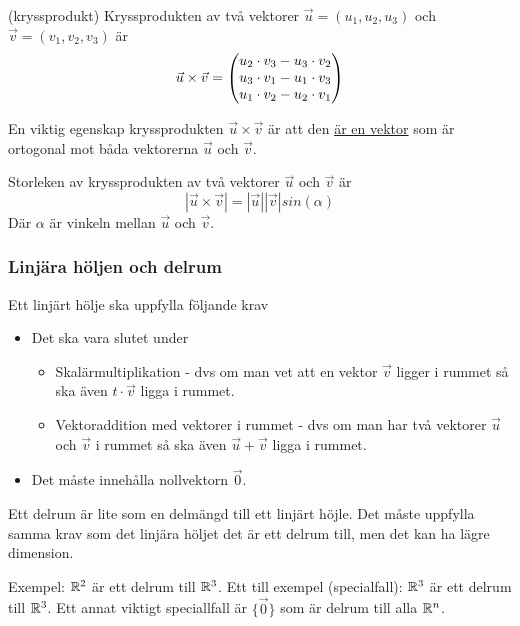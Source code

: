 \documentclass[../main.tex]{subfiles}
\begin{document}
\begin{formel}{(kryssprodukt)}
\label{kryssprod} 
Kryssprodukten av två vektorer $\vec{u} = (u_1, u_2, u_3)$ och $\vec{v} = (v_1, v_2, v_3)$ är
\[\vec{u}\times \vec{v} = \begin{pmatrix}u_2\cdot v_3 - u_3\cdot v_2\\u_3\cdot v_1 - u_1\cdot v_3\\u_1\cdot v_2 - u_2\cdot v_1\end{pmatrix}\]

En viktig egenskap kryssprodukten $\vec{u}\times\vec{v}$ är att den \underline{är en vektor} som är ortogonal mot båda vektorerna $\vec{u}$ och $\vec{v}$.
\end{formel}


\begin{formel}
\label{kryssprodsize} 
Storleken av kryssprodukten av två vektorer $\vec{u}$ och $\vec{v}$ är
\[|\vec{u}\times \vec{v}| = |\vec{u}||\vec{v}|sin(\alpha)\]
Där $\alpha$ är vinkeln mellan $\vec{u}$ och $\vec{v}$.
\end{formel}

\subsubsection{Linjära höljen och delrum}
\label{vektorrum}
Ett linjärt hölje ska uppfylla följande krav
\begin{itemize}
    \item Det ska vara slutet under
    \begin{itemize}
        \item Skalärmultiplikation - dvs om man vet att en vektor $\vec{v}$ ligger i rummet så ska även $t\cdot\vec{v}$ ligga i rummet.
        \item Vektoraddition med vektorer i rummet - dvs om man har två vektorer $\vec{u}$ och $\vec{v}$ i rummet så ska även $\vec{u}+\vec{v}$ ligga i rummet.
    \end{itemize}
    \item Det måste innehålla nollvektorn $\vec{0}$.
\end{itemize}

Ett delrum är lite som en delmängd till ett linjärt höjle. Det måste uppfylla samma krav som det linjära höljet det är ett delrum till, men det kan ha lägre dimension. 

Exempel: $\mathbb{R}^{2}$ är ett delrum till $\mathbb{R}^{3}$. Ett till exempel (specialfall): $\mathbb{R}^{3}$ är ett delrum till $\mathbb{R}^{3}$. Ett annat viktigt speciallfall är $\{\vec{0}\}$ som är delrum till alla $\mathbb{R}^{n}$.
\end{document}
